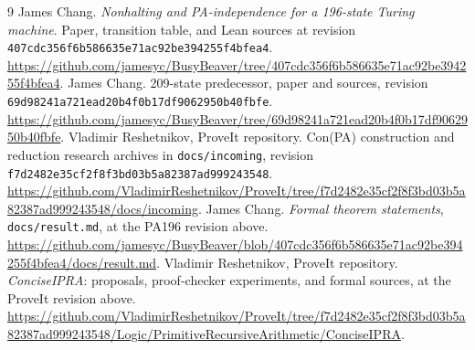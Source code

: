 \documentclass[11pt,letterpaper]{article}
\newcommand{\file}[1]{\texttt{\nolinkurl{#1}}}
\begin{document}
\begin{thebibliography}{9}
 James Chang.
\emph{Nonhalting and PA-independence for a 196-state Turing machine}.
Paper, transition table, and Lean sources at revision
\file{407cdc356f6b586635e71ac92be394255f4bfea4}.
\url{https://github.com/jamesyc/BusyBeaver/tree/407cdc356f6b586635e71ac92be394255f4bfea4}.
 James Chang.
209-state predecessor, paper and sources, revision
\file{69d98241a721ead20b4f0b17df9062950b40fbfe}.
\url{https://github.com/jamesyc/BusyBeaver/tree/69d98241a721ead20b4f0b17df9062950b40fbfe}.
 Vladimir Reshetnikov, ProveIt repository.
Con(PA) construction and reduction research archives in
\file{docs/incoming}, revision
\file{f7d2482e35cf2f8f3bd03b5a82387ad999243548}.
\url{https://github.com/VladimirReshetnikov/ProveIt/tree/f7d2482e35cf2f8f3bd03b5a82387ad999243548/docs/incoming}.
 James Chang.
\emph{Formal theorem statements}, \file{docs/result.md}, at the PA196
revision above.
\url{https://github.com/jamesyc/BusyBeaver/blob/407cdc356f6b586635e71ac92be394255f4bfea4/docs/result.md}.
 Vladimir Reshetnikov, ProveIt repository.
\emph{ConciseIPRA}: proposals, proof-checker experiments, and formal sources,
at the ProveIt revision above.
\url{https://github.com/VladimirReshetnikov/ProveIt/tree/f7d2482e35cf2f8f3bd03b5a82387ad999243548/Logic/PrimitiveRecursiveArithmetic/ConciseIPRA}.
\end{thebibliography}
\end{document}
